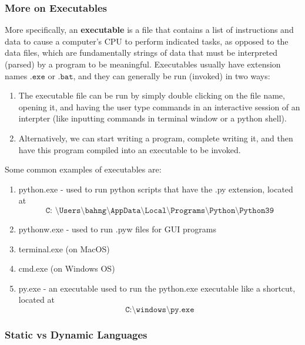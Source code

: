 \documentclass{article}
\begin{document}
    \subsubsection{More on Executables}

      More specifically, an \textbf{executable} is a file that contains a list of instructions and data to cause a computer's CPU to perform indicated tasks, as opposed to the data files, which are fundamentally strings of data that must be interpreted (parsed) by a program to be meaningful. Executables usually have extension names $\texttt{.exe}$ or $\texttt{.bat}$, and they can generally be run (invoked) in two ways: 
      \begin{enumerate}
          \item The executable file can be run by simply double clicking on the file name, opening it, and having the user type commands in an interactive session of an interpter (like inputting commands in terminal window or a python shell).
          \item Alternatively, we can start writing a program, complete writing it, and then have this program compiled into an executable to be invoked.
      \end{enumerate}
      Some common examples of executables are:
      \begin{enumerate}
          \item python.exe - used to run python scripts that have the .py extension, located at 
          \[\texttt{C: \textbackslash Users\textbackslash bahng\textbackslash AppData\textbackslash Local\textbackslash Programs\textbackslash Python\textbackslash Python39}\]
          \item pythonw.exe - used to run .pyw files for GUI programs
          \item terminal.exe (on MacOS)
          \item cmd.exe (on Windows OS)
          \item py.exe - an executable used to run the python.exe executable like a shortcut, located at 
          \[\texttt{C:\textbackslash windows\textbackslash py.exe}\]
      \end{enumerate}

    \subsubsection{Static vs Dynamic Languages}
\end{document}
